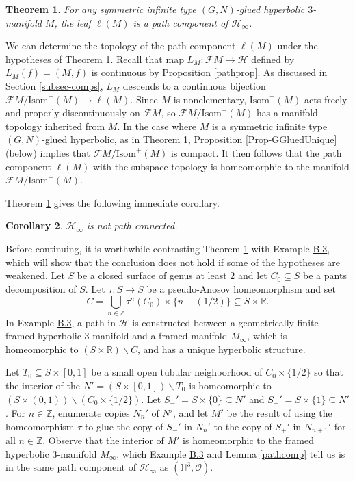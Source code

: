 \documentclass[11pt,leqno]{article}
\newtheorem{theorem}{Theorem}
\newtheorem{maincor}[theorem]{Corollary}
\theoremstyle{introdef}
\numberwithin{lemma}{section}
\theoremstyle{definition}
\newcommand{\R}{\mathbb{R}}
\newcommand{\Z}{\mathbb{Z}}
\begin{document}
\begin{theorem}
    \label{Thm-GGluePathComp}
    For any symmetric infinite type $(G,N)$-glued hyperbolic $3$-manifold $M$, the leaf $\ell(M)$ is a path component of $\mathcal{H}_\infty$.
\end{theorem}

We can determine the topology of the path component $\ell(M)$ under the hypotheses of Theorem \ref{Thm-GGluePathComp}. Recall that map $L_M:\mathcal{F}M\rightarrow\mathcal{H}$ defined by $L_M(f)=(M,f)$ is continuous by Proposition \ref{pathprop}. As discussed in Section \ref{subsec-comps}, $L_M$ descends to a continuous bijection $\mathcal{F}M/\mathrm{Isom}^+(M)\rightarrow\ell(M)$. Since $M$ is nonelementary, $\mathrm{Isom}^+(M)$ acts freely and properly discontinuously on $\mathcal{F}M$, so $\mathcal{F}M/\mathrm{Isom}^+(M)$ has a manifold topology inherited from $M$. In the case where $M$ is a symmetric infinite type $(G,N)$-glued hyperbolic, as in Theorem \ref{Thm-GGluePathComp}, Proposition \ref{Prop-GGluedUnique} (below) implies that $\mathcal{F}M/\mathrm{Isom}^+(M)$ is compact. It then follows that the path component $\ell(M)$ with the subspace topology is homeomorphic to the manifold $\mathcal{F}M/\mathrm{Isom}^+(M)$. \par


Theorem \ref{Thm-GGluePathComp} gives the following immediate corollary.

\begin{maincor}
\label{cor-notpathconn}
    $\mathcal{H}_\infty$ is not path connected.
\end{maincor}

Before continuing, it is worthwhile contrasting Theorem \ref{Thm-GGluePathComp} with Example \hyperlink{Ex-NonTame}{B.3}, which will show that the conclusion does not hold if some of the hypotheses are weakened. Let $S$ be a closed surface of genus at least $2$ and let $C_0\subseteq S$ be a pants decomposition of $S$. Let $\tau:S\rightarrow S$ be a pseudo-Anosov homeomorphism and set \[C=\bigcup_{n\in \Z}\tau^n(C_0)\times\{n+(1/2)\}\subseteq S\times\R.\] In Example \hyperlink{Ex-NonTame}{B.3}, a path in $\mathcal{H}$ is constructed between a geometrically finite framed hyperbolic $3$-manifold and a framed manifold $M_{\infty}$, which is homeomorphic to $(S\times\R)\backslash C$, and has a unique hyperbolic structure.\par

Let $T_0\subseteq S\times [0,1]$ be a small open tubular neighborhood of $C_0\times\{1/2\}$ so that the interior of the $N'=(S\times[0,1])\backslash T_0$ is homeomorphic to $(S\times(0,1))\backslash(C_0\times\{1/2\})$. Let $S_-'=S\times\{0\}\subseteq N'$ and $S_+'=S\times\{1\}\subseteq N'$. For $n\in\Z$, enumerate copies $N_n'$ of $N'$, and let $M'$ be the result of using the homeomorphism $\tau$ to glue the copy of $S_-'$ in $N_n'$ to the copy of $S_+'$ in $N_{n+1}'$ for all $n\in\Z$. Observe that the interior of $M'$ is homeomorphic to the framed hyperbolic $3$-manifold $M_\infty$, which Example \hyperlink{Ex-NonTame}{B.3} and Lemma \ref{pathcomp} tell us is in the same path component of $\mathcal{H}_\infty$ as $(\mathbb{H}^3,\mathcal{O})$.\par
\end{document}

